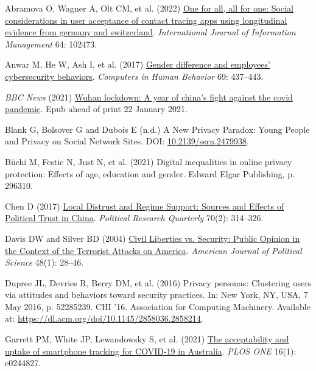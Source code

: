 \documentclass[
  letterpaper,
  DIV=11,
  numbers=noendperiod]{scrartcl}
\newlength{\cslhangindent}
\newenvironment{CSLReferences}[2] %
 {\begin{list}{}{%
  \setlength{\itemindent}{0pt}
  \setlength{\leftmargin}{0pt}
  \setlength{\parsep}{0pt}
  \ifodd #1
   \setlength{\leftmargin}{\cslhangindent}
   \setlength{\itemindent}{-1\cslhangindent}
  \fi
  \setlength{\itemsep}{#2\baselineskip}}}
 {\end{list}}
\begin{document}
\label{refs}
\begin{CSLReferences}{1}{1}
Abramova O, Wagner A, Olt CM, et al. (2022)
\href{https://doi.org/10.1016/j.ijinfomgt.2022.102473}{One for all, all
for one: Social considerations in user acceptance of contact tracing
apps using longitudinal evidence from germany and switzerland}.
\emph{International Journal of Information Management} 64: 102473.

Anwar M, He W, Ash I, et al. (2017)
\href{https://doi.org/10.1016/j.chb.2016.12.040}{Gender difference and
employees' cybersecurity behaviors}. \emph{Computers in Human Behavior}
69: 437--443.

\emph{BBC News} (2021)
\href{https://www.bbc.com/news/world-asia-china-55628488}{Wuhan
lockdown: A year of china's fight against the covid pandemic}. Epub
ahead of print 22 January 2021.

Blank G, Bolsover G and Dubois E (n.d.) A New Privacy Paradox: Young
People and Privacy on Social Network Sites. DOI:
\href{https://doi.org/10.2139/ssrn.2479938}{10.2139/ssrn.2479938}.

Büchi M, Festic N, Just N, et al. (2021) Digital inequalities in online
privacy protection: Effects of age, education and gender. Edward Elgar
Publishing, p. 296310.

Chen D (2017) \href{https://doi.org/10.1177/1065912917691360}{Local
Distrust and Regime Support: Sources and Effects of Political Trust in
China}. \emph{Political Research Quarterly} 70(2): 314--326.

Davis DW and Silver BD (2004)
\href{https://doi.org/10.1111/j.0092-5853.2004.00054.x}{Civil Liberties
vs. Security: Public Opinion in the Context of the Terrorist Attacks on
America}. \emph{American Journal of Political Science} 48(1): 28--46.

Dupree JL, Devries R, Berry DM, et al. (2016) Privacy personas:
Clustering users via attitudes and behaviors toward security practices.
In: New York, NY, USA, 7 May 2016, p. 52285239. CHI '16. Association for
Computing Machinery. Available at:
\url{https://dl.acm.org/doi/10.1145/2858036.2858214}.

Garrett PM, White JP, Lewandowsky S, et al. (2021)
\href{https://doi.org/10.1371/journal.pone.0244827}{The acceptability
and uptake of smartphone tracking for COVID-19 in Australia}. \emph{PLOS
ONE} 16(1): e0244827.


\end{CSLReferences}
\end{document}
